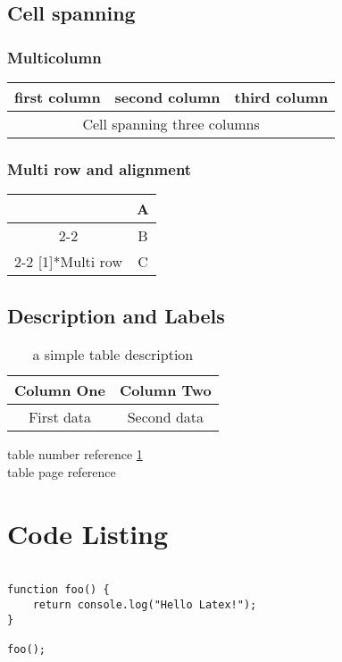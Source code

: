 \documentclass[12pt]{article}
\begin{document}
\subsection{Cell spanning}

\subsubsection{Multicolumn}
\begin{tabular}{|l|l|l|}
\hline
first column & second column & third column \\
\hline
\multicolumn{3}{|c|}{Cell spanning three columns} \\
\hline
\end{tabular}

\subsubsection{Multi row and alignment}

\begin{tabular}{|c|c|}
\hline
& A \\
\cline{2-2}
& B \\
\cline{2-2}
\multirow[c]{-3}[1]{*}{Multi row} & C \bigstrut \\
\hline
\end{tabular}


\subsection{Description and Labels}
\begin{table}[H]
\centering
\begin{tabular}{|c|c|}
\hline
\bfseries Column One & \bfseries Column Two\\
\hline
First data & Second data\\ \hline
\end{tabular}
\caption{a simple table description}
\label{table:simple}
\end{table}

\noindent table number reference \ref{table:simple} \\
table page reference \pageref{table:simple}

\pagebreak

\section{Code Listing}
\begin{verbatim}

function foo() {
    return console.log("Hello Latex!");
}

foo();

\end{verbatim}
\end{document}
